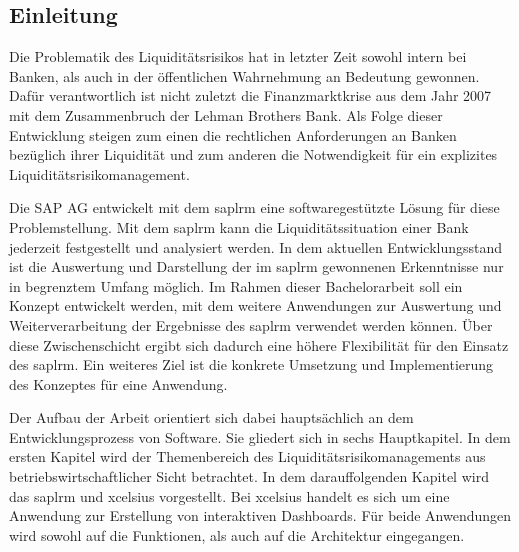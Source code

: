 

\begin{onehalfspacing}

\chapter{Einleitung}
\glsresetall
Die Problematik des Liquiditätsrisikos hat in letzter Zeit sowohl intern bei Banken, als auch in der öffentlichen Wahrnehmung an Bedeutung gewonnen. Dafür verantwortlich ist nicht zuletzt die Finanzmarktkrise aus dem Jahr 2007 mit dem Zusammenbruch der Lehman Brothers Bank. Als Folge dieser Entwicklung steigen zum einen die rechtlichen Anforderungen an Banken bezüglich ihrer Liquidität und zum anderen die Notwendigkeit für ein explizites Liquiditätsrisikomanagement. 

Die SAP AG entwickelt mit dem \gls{saplrm} eine softwaregestützte Lösung für diese Problemstellung. Mit dem \gls{saplrm} kann die Liquiditätssituation einer Bank jederzeit festgestellt und analysiert werden. In dem aktuellen Entwicklungsstand ist die Auswertung und Darstellung der im \gls{saplrm} gewonnenen Erkenntnisse nur in begrenztem Umfang möglich. Im Rahmen dieser Bachelorarbeit soll ein Konzept entwickelt werden, mit dem weitere Anwendungen zur Auswertung und Weiterverarbeitung der Ergebnisse des \gls{saplrm} verwendet werden können. Über diese Zwischenschicht ergibt sich dadurch eine höhere Flexibilität für den Einsatz des \gls{saplrm}. Ein weiteres Ziel ist die konkrete Umsetzung und Implementierung des Konzeptes für eine Anwendung.

Der Aufbau der Arbeit orientiert sich dabei hauptsächlich an dem Entwicklungsprozess von Software. Sie gliedert sich in sechs Hauptkapitel. In dem ersten Kapitel wird der Themenbereich des Liquiditätsrisikomanagements aus betriebswirtschaftlicher Sicht betrachtet. In dem darauffolgenden Kapitel wird das \gls{saplrm} und \gls{xcelsius} vorgestellt. Bei \gls{xcelsius} handelt es sich um eine Anwendung zur Erstellung von interaktiven Dashboards. Für beide Anwendungen wird sowohl auf die Funktionen, als auch auf die Architektur eingegangen.


\end{onehalfspacing}
